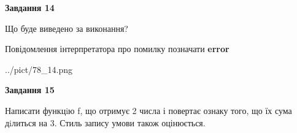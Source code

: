 \documentclass[11pt, ukrainian]{article}
\begin{document}
{\begin {large}
{\begin {center}\textbf{Завдання 14}\end {center}}\par
Що буде виведено за виконання? \par
Повідомлення інтерпретатора про помилку позначати \textbf{error}

\begin{center}
	{../pict/78_14.png}
\end{center}
\newpage

{\begin {center}\textbf{Завдання 15}\end {center}}\par

Написати функцiю f, що отримує 2 числа і повертає ознаку того, що їх сума дiлиться на 3. Стиль запису умови також оцінюється.\par
\newpage

\end {large}}
\end{document}
